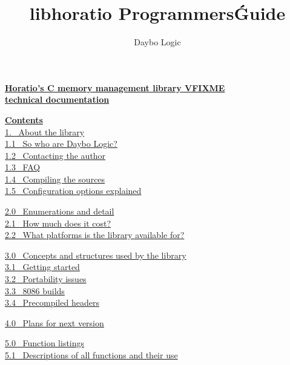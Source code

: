 \documentclass{article}
\begin{document}
\title{libhoratio Programmers\' Guide}\author{Daybo Logic}
\maketitle
\newpage
\textbf{\underline{Horatio's C memory management library
VFIXME}}
\\
\textbf{\underline{technical documentation}}
\par \textbf{\underline{Contents}}
\\
\href{#About}{1.~ About the library}
\\
\href{#Who}{1.1~ So who are Daybo Logic?}
\\
\href{#Contact}{1.2~ Contacting the author}
\\
\href{#FAQ}{1.3~ FAQ}
\\
\href{#Compile}{1.4~ Compiling the sources}
\\
\href{#Config}{1.5~ Configuration options explained}

\par \href{#Enumerations}{2.0~ Enumerations and detail}\\
\href{#Cost}{2.1~ How much does it cost?}
\\
\href{#Platforms}{2.2~ What platforms is the library available
for?}

\par \href{#Concepts}{3.0~ Concepts and structures used by the
library}
\\
\href{#Starting}{3.1~ Getting started}
\\
\href{#Portability}{3.2~ Portability issues}
\\
\href{#8086}{3.3~ 8086 builds}
\\
\href{#PCH}{3.4~ Precompiled headers}

\href{#Plans}{4.0~ Plans for next version}

\par \href{#Listings}{5.0~ Function listings}\\
\href{#FuncDescs}{5.1~ Descriptions of all functions and their use}
\end{document}
